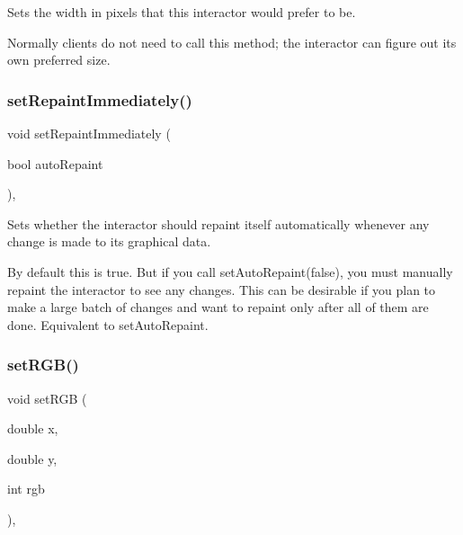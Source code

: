 Sets the width in pixels that this interactor would prefer to be. 

Normally clients do not need to call this method; the interactor can figure out its own preferred size. \mbox{\label{classsgl_1_1GDrawingSurface_abf5590a3992dcb7896ed449e65961da3}} 
\subsubsection{\texorpdfstring{set\+Repaint\+Immediately()}{setRepaintImmediately()}}
{\footnotesize\ttfamily void set\+Repaint\+Immediately (\begin{DoxyParamCaption}\item[{bool}]{auto\+Repaint }\end{DoxyParamCaption})\hspace{0.3cm}{\ttfamily [virtual]}, {\ttfamily [inherited]}}



Sets whether the interactor should repaint itself automatically whenever any change is made to its graphical data. 

By default this is true. But if you call set\+Auto\+Repaint(false), you must manually repaint the interactor to see any changes. This can be desirable if you plan to make a large batch of changes and want to repaint only after all of them are done. Equivalent to set\+Auto\+Repaint. \mbox{\label{classsgl_1_1GDrawingSurface_a8bcbd65fa784bdab1e66a9efd381162d}} 
\subsubsection{\texorpdfstring{set\+R\+G\+B()}{setRGB()}\hspace{0.1cm}{\footnotesize\ttfamily [1/3]}}
{\footnotesize\ttfamily void set\+R\+GB (\begin{DoxyParamCaption}\item[{double}]{x,  }\item[{double}]{y,  }\item[{int}]{rgb }\end{DoxyParamCaption})\hspace{0.3cm}{\ttfamily [virtual]}, {\ttfamily [inherited]}}



